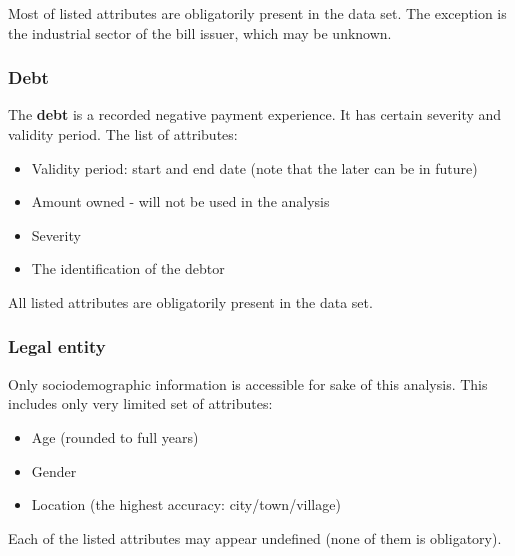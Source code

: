 \documentclass{article}
\begin{document}
Most of listed attributes are obligatorily present in the data set. The exception is the industrial sector of the bill issuer, which may be unknown.

\subsubsection{Debt}

The \textbf{debt} is a recorded negative payment experience. It has certain severity and validity period. The list of attributes:
\begin{itemize}
    \item Validity period: start and end date (note that the later can be in future)
    \item Amount owned - will not be used in the analysis
    \item Severity
    \item The identification of the debtor
\end{itemize}

All listed attributes are obligatorily present in the data set.

\subsubsection{Legal entity}

Only sociodemographic information is accessible for sake of this analysis. This includes only very limited set of attributes:

\begin{itemize}
    \item Age (rounded to full years)
    \item Gender
    \item Location (the highest accuracy: city/town/village)
\end{itemize}

Each of the listed attributes may appear undefined (none of them is obligatory).
\end{document}

